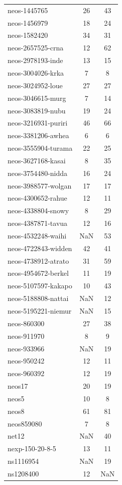 \begin{longtable}{lcc}
neos-1445765 & 26 & 43 \\
neos-1456979 & 18 & 24 \\
neos-1582420 & 34 & 31 \\
neos-2657525-crna & 12 & 62 \\
neos-2978193-inde & 13 & 15 \\
neos-3004026-krka & 7 & 8 \\
neos-3024952-loue & 27 & 27 \\
neos-3046615-murg & 7 & 14 \\
neos-3083819-nubu & 19 & 24 \\
neos-3216931-puriri & 46 & 66 \\
neos-3381206-awhea & 6 & 6 \\
neos-3555904-turama & 22 & 25 \\
neos-3627168-kasai & 8 & 35 \\
neos-3754480-nidda & 16 & 24 \\
neos-3988577-wolgan & 17 & 17 \\
neos-4300652-rahue & 12 & 11 \\
neos-4338804-snowy & 8 & 29 \\
neos-4387871-tavua & 12 & 16 \\
neos-4532248-waihi & NaN & 53 \\
neos-4722843-widden & 42 & 41 \\
neos-4738912-atrato & 31 & 59 \\
neos-4954672-berkel & 11 & 19 \\
neos-5107597-kakapo & 10 & 43 \\
neos-5188808-nattai & NaN & 12 \\
neos-5195221-niemur & NaN & 15 \\
neos-860300 & 27 & 38 \\
neos-911970 & 8 & 9 \\
neos-933966 & NaN & 19 \\
neos-950242 & 12 & 11 \\
neos-960392 & 12 & 19 \\
neos17 & 20 & 19 \\
neos5 & 10 & 8 \\
neos8 & 61 & 81 \\
neos859080 & 7 & 8 \\
net12 & NaN & 40 \\
nexp-150-20-8-5 & 13 & 11 \\
ns1116954 & NaN & 19 \\
ns1208400 & 12 & NaN \\

\end{longtable}
